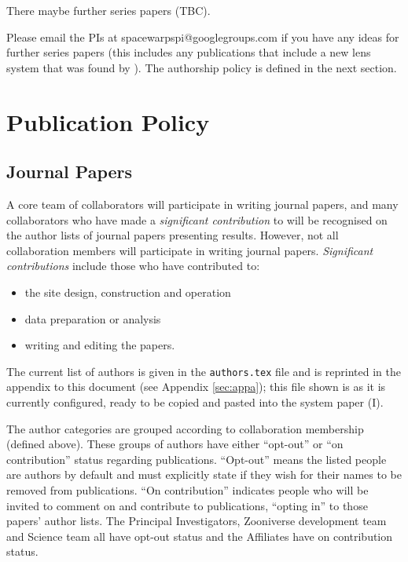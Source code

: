 \documentclass[a4paper]{article}
\begin{document}
There maybe further series papers (TBC).\newline

Please email the \sw PIs at spacewarpspi@googlegroups.com if you have any
ideas for further \sw series papers (this includes any publications that
include a new lens system that was found by \sw). The authorship policy is
defined in the next section.



\section{Publication Policy}
\label{sec:publ}

\subsection{Journal Papers}
\label{sec:series}

A core team of collaborators will participate in writing journal papers, and
many collaborators who have made a \textit{significant contribution} to \sw
will be recognised on the author lists of journal papers presenting \sw
results.  However, not all collaboration members will participate in writing
journal papers.  \textit{Significant contributions} include those who have
contributed to:
\begin{itemize}
\item the site design, construction and operation
\item data preparation or analysis
\item writing and editing the papers. 
\end{itemize}


The current list of \sw authors is given in the \texttt{authors.tex} file and
is reprinted in the appendix to this document (see Appendix \ref{sec:appa});
this file shown is as it is currently configured, ready to be copied and
pasted into the \sw system paper (\sw I). 

\noindent The author categories are grouped according to collaboration
membership (defined above). These groups of authors have either  ``opt-out''
or ``on contribution'' status regarding \sw publications.  ``Opt-out'' means
the listed people are authors by default and must explicitly state if they
wish for their names to be removed from \sw publications. ``On contribution''
indicates people who will be invited to comment on and contribute to
publications, ``opting in'' to those papers' author lists. The Principal
Investigators, Zooniverse development team and \sw Science team all have
opt-out status and the \sw Affiliates have on contribution status.
\end{document}
